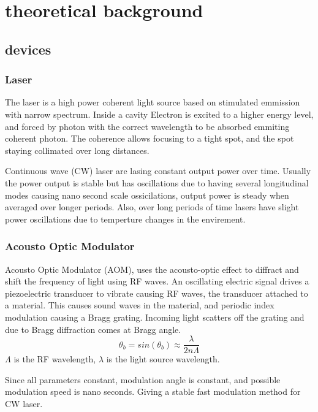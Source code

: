\documentclass[\main/master.tex]{subfiles}
\begin{document}
\chapter{theoretical background}\label{chp:example-2}
\section{devices}

\subsection{Laser}
The laser is a high power coherent light source based on stimulated emmission with narrow spectrum. Inside a cavity Electron is excited to a higher energy level, and forced by photon with the correct wavelength to be absorbed emmiting coherent photon. The coherence allows focusing to a tight spot, and the spot staying collimated over long distances. 
\par
Continuous wave (CW) laser are lasing constant output power over time. Usually the power output is stable but has oscillations due to having several longitudinal modes causing nano second scale ossicilations, output power is steady when averaged over longer periods. Also, over long periods of time lasers have slight power oscillations due to temperture changes in the envirement.

\subsection{Acousto Optic Modulator}
Acousto Optic Modulator (AOM), uses the acousto-optic effect to diffract and shift the frequency of light using RF waves. An oscillating electric signal drives a piezoelectric transducer to vibrate causing RF waves, the transducer attached to a material. This causes sound waves in the material, and periodic index modulation causing a Bragg grating. Incoming light scatters off the grating and due to Bragg diffraction comes at Bragg angle.
\begin{equation}
\theta_b = sin(\theta_b)\approx \frac{\lambda}{2n\Lambda} \label{eqn:energy-mass-equivalence-relation}
\end{equation} 
$\Lambda$ is the RF wavelength, $\lambda$ is the light source wavelength. 
\par
Since all parameters constant, modulation angle is constant, and possible modulation speed is nano seconds. Giving a stable fast modulation method for CW laser.
\end{document}
